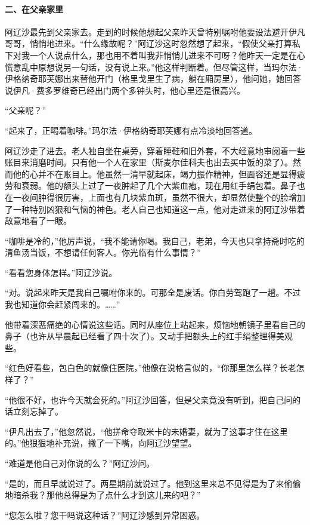 \paragraph*{二、在父亲家里}
\par 阿辽沙最先到父亲家去。走到的时候他想起父亲昨天曾特别嘱咐他要设法避开伊凡哥哥，悄悄地进来。“什么缘故呢？”阿辽沙这时忽然想了起来，“假使父亲打算私下对我一个人说点什么，那也用不着叫我非悄悄儿进来不可呀？他昨天一定是在心慌意乱中原想说另一句话，没有说上来。”他这样判断着。但尽管这样，当玛尔法·伊格纳奇耶芙娜出来替他开门（格里戈里生了病，躺在厢房里），他问她，她回答说伊凡·费多罗维奇已经出门两个多钟头时，他心里还是很高兴。
\par “父亲呢？”
\par “起来了，正喝着咖啡。”玛尔法·伊格纳奇耶芙娜有点冷淡地回答道。
\par 阿辽沙走了进去。老人独自坐在桌旁，穿着睡鞋和旧外套，不大经意地审阅着一些账目来消磨时间。只有他一个人在家里（斯麦尔佳科夫也出去买中饭的菜了）。然而他的心并不在账目上。他虽然一清早就起床，竭力振作精神，但面容还是显得疲劳和衰弱。他的额头上过了一夜肿起了几个大紫血疱，现在用红手绢包着。鼻子也在一夜间肿得很厉害，上面也有几块紫血斑，虽然不很大，却显然使整个的脸增加了一种特别凶狠和气恼的神色。老人自己也知道这一点，他对走进来的阿辽沙带着敌意地看了一眼。
\par “咖啡是冷的，”他厉声说，“我不能请你喝。我自己，老弟，今天也只拿持斋时吃的清鱼汤当饭，不想请任何客人。你光临有什么事情？”
\par “看看您身体怎样。”阿辽沙说。
\par “对。说起来昨天是我自己嘱咐你来的。可那全是废话。你白劳驾跑了一趟。不过我也知道你会赶紧闯来的。……”
\par 他带着深恶痛绝的心情说这些话。同时从座位上站起来，烦恼地朝镜子里看自己的鼻子（也许从早晨起已经看了四十次了）。又动手把额头上的红手绢整理得美观些。
\par “红色好看些，包白色的就像住医院，”他像在说格言似的，“你那里怎么样？长老怎样了？”
\par “他很不好，也许今天就会死的。”阿辽沙回答，但是父亲竟没有听到，把自己问的话立刻忘掉了。
\par “伊凡出去了，”他忽然说，“他拼命夺取米卡的未婚妻，就为了这事才住在这里的。”他狠狠地补充说，撇了一下嘴，向阿辽沙望望。
\par “难道是他自己对你说的么？”阿辽沙问。
\par “是的，而且早就说过了。两星期前就说过了。他到这里来总不见得是为了来偷偷地暗杀我？那他总得是为了点什么才到这儿来的吧？”
\par “您怎么啦？您干吗说这种话？”阿辽沙感到异常困惑。
